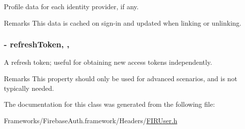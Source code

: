 Profile data for each identity provider, if any. 

\begin{DoxyRemark}{Remarks}
This data is cached on sign-\/in and updated when linking or unlinking. 
\end{DoxyRemark}
\hypertarget{interface_f_i_r_user_a7773545eef6e78ee94d863301c55a4d5}{}
\subsubsection[{refresh\+Token}]{\setlength{\rightskip}{0pt plus 5cm}-\/ refresh\+Token\hspace{0.3cm}{\ttfamily [read]}, {\ttfamily [nonatomic]}, {\ttfamily [assign]}}\label{interface_f_i_r_user_a7773545eef6e78ee94d863301c55a4d5}


A refresh token; useful for obtaining new access tokens independently. 

\begin{DoxyRemark}{Remarks}
This property should only be used for advanced scenarios, and is not typically needed. 
\end{DoxyRemark}


The documentation for this class was generated from the following file\+:\begin{DoxyCompactItemize}
\item 
Frameworks/\+Firebase\+Auth.\+framework/\+Headers/\hyperlink{_f_i_r_user_8h}{F\+I\+R\+User.\+h}\end{DoxyCompactItemize}
